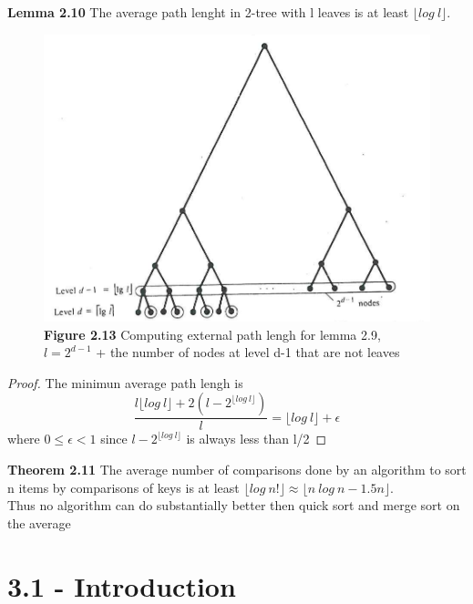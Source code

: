\documentclass[a4paper,10pt,titlepage]{report}
\begin{document}
\textbf{Lemma 2.10} The average path lenght in 2-tree with l leaves is at least $\lfloor log \ l \rfloor$.\\

\begin{figure}[h]
\includegraphics[scale=0.3]{notes_2_13.png}
\caption{\textbf{Figure 2.13} Computing external path lengh for lemma 2.9, $l = 2^{d-1}$ + the number of nodes at level d-1 that are not leaves}
\end{figure}

\begin{proof}
The minimun average path lengh is 
\begin{equation}
\frac{l \lfloor log \ l \rfloor +2(l-2^{\lfloor log \ l \rfloor})}{l} = \lfloor log \ l \rfloor + \epsilon
\end{equation}
where $0 \leq \epsilon < 1 $ since $ l-2^{\lfloor log \ l \rfloor}$ is always less than l/2
\end{proof}
\vspace{5mm}
\textbf{Theorem 2.11} The average number of comparisons done by an algorithm to sort n items by comparisons of keys is at least $\lfloor log \ n! \rfloor \approx \lfloor n \ log \ n - 1.5n \rfloor$.\\
Thus no algorithm can do substantially better then quick sort and merge sort on the average


\section{3.1 - Introduction}
\end{document}
